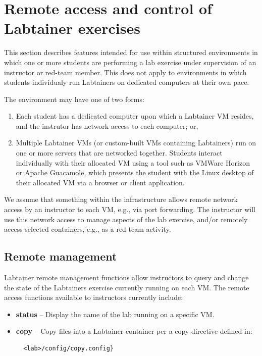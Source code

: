 \documentclass[12pt]{article}
\begin{document}
\section {Remote access and control of Labtainer exercises}
This section describes features intended for use within structured environments in which one or more students are performing 
a lab exercise under supervision of an instructor or red-team member.  This does not apply to environments in which students 
individualy run Labtainers on dedicated computers at their own pace. 

The environment may have one of two forms:

\begin{enumerate}
\item Each student has a dedicated computer upon which a Labtainer VM resides, and the instrutor has network access to each computer; or,
\item Multiple Labtainer VMs (or custom-built VMs containing Labtainers) run on one or more servers that are networked together.  
Students interact individually with their allocated VM using a tool such as VMWare Horizon or Apache Guacamole, 
which presents the student with the Linux desktop of their allocated VM via a browser or client application.
\end{enumerate}
\noindent We assume that something within the infrastructure allows remote network access by an instructor to each VM, e.g.,
via port forwarding.  The instructor will use this network access to manage aspects of the lab exercise, and/or remotely access
selected containers, e.g., as a red-team activity.

\subsection{Remote management}
Labtainer remote management functions allow instructors to query and change the state of the Labtainers exercise 
currently running on each VM.  The remote access functions available to instructors currently include:
\begin{itemize}
\item \textbf{status} -- Display the name of the lab running on a specific VM.
\item \textbf{copy} -- Copy files into a Labtainer container per a copy directive defined in:
\begin{verbatim}
  <lab>/config/copy.config} 
\end{verbatim}
\end{itemize}
\end{document}
